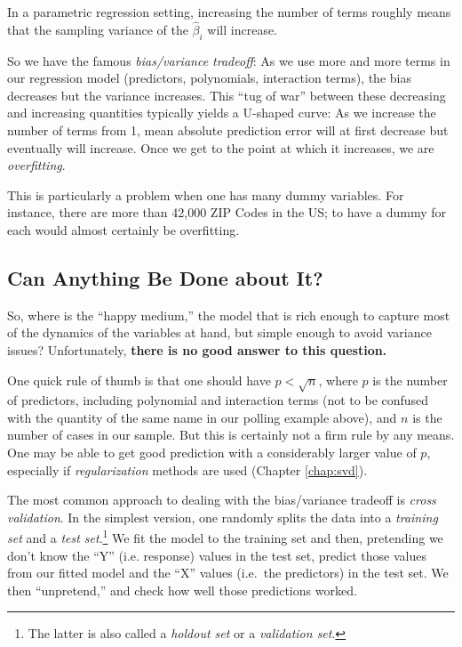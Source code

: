In a parametric regression setting, increasing the number of terms
roughly means that the sampling variance of the $\widehat{\beta}_i$ will
increase.

So we have the famous \textit{bias/variance tradeoff}:  As we use more and
more terms in our regression model (predictors, polynomials, interaction
terms), the bias decreases but the variance increases.  This ``tug of
war'' between these decreasing and increasing quantities typically
yields a U-shaped curve:  As we increase the number of terms from 1,
mean absolute prediction error will at first decrease but eventually
will increase.  Once we get to the point at which it increases, we are
\textit{overfitting}.

This is particularly a problem when one has many dummy variables. For
instance, there are more than 42,000 ZIP Codes in the US; to have a
dummy for each would almost certainly be overfitting.

\subsection{Can Anything Be Done about It?}

So, where is the ``happy medium,'' the model that is rich enough to
capture most of the dynamics of the variables at hand, but simple enough
to avoid variance issues?  Unfortunately, \textbf{there is no good answer to
this question.}

One quick rule of thumb is that one should have $p < \sqrt{n}$, where
$p$ is the number of predictors, including polynomial and interaction
terms (not to be confused with the quantity of the same name in our
polling example above), and $n$ is the number of cases in our sample.
But this is certainly not a firm rule by any means.  One may be able to
get good prediction with a considerably larger value of $p$, especially
if \textit{regularization} methods are used (Chapter \ref{chap:svd}).

The most common approach to dealing with the bias/variance tradeoff is
\textit{cross validation}.  In the simplest version, one randomly splits
the data into a \textit{training set} and a \textit{test
set}.\footnote{The latter is also called a \textit{holdout set} or a
\textit{validation set}.}  We fit the model to the training set and
then, pretending we don't know the ``Y'' (i.e. response) values in the
test set, predict those values from our fitted model and the ``X''
values (i.e.\ the predictors) in the test set.  We then ``unpretend,''
and check how well those predictions worked. 

